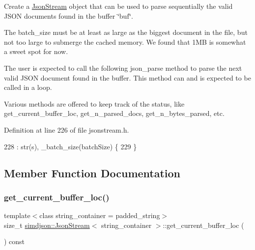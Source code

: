Create a \hyperlink{classsimdjson_1_1_json_stream}{Json\+Stream} object that can be used to parse sequentially the valid J\+S\+ON documents found in the buffer \char`\"{}buf\char`\"{}. 

The batch\+\_\+size must be at least as large as the biggest document in the file, but not too large to submerge the cached memory. We found that 1\+MB is somewhat a sweet spot for now.

The user is expected to call the following json\+\_\+parse method to parse the next valid J\+S\+ON document found in the buffer. This method can and is expected to be called in a loop.

Various methods are offered to keep track of the status, like get\+\_\+current\+\_\+buffer\+\_\+loc, get\+\_\+n\+\_\+parsed\+\_\+docs, get\+\_\+n\+\_\+bytes\+\_\+parsed, etc. 

Definition at line 226 of file jsonstream.\+h.


\begin{DoxyCode}
228     : str(s), \_batch\_size(batchSize) \{
229 \}
\end{DoxyCode}


\subsection{Member Function Documentation}
\mbox{\label{classsimdjson_1_1_json_stream_a01493e28b0606bcef1e03c233214382b}} 
\subsubsection{\texorpdfstring{get\+\_\+current\+\_\+buffer\+\_\+loc()}{get\_current\_buffer\_loc()}}
{\footnotesize\ttfamily template$<$class string\+\_\+container  = padded\+\_\+string$>$ \\
size\+\_\+t \hyperlink{classsimdjson_1_1_json_stream}{simdjson\+::\+Json\+Stream}$<$ string\+\_\+container $>$\+::get\+\_\+current\+\_\+buffer\+\_\+loc (\begin{DoxyParamCaption}{ }\end{DoxyParamCaption}) const\hspace{0.3cm}{\ttfamily [inline]}}



